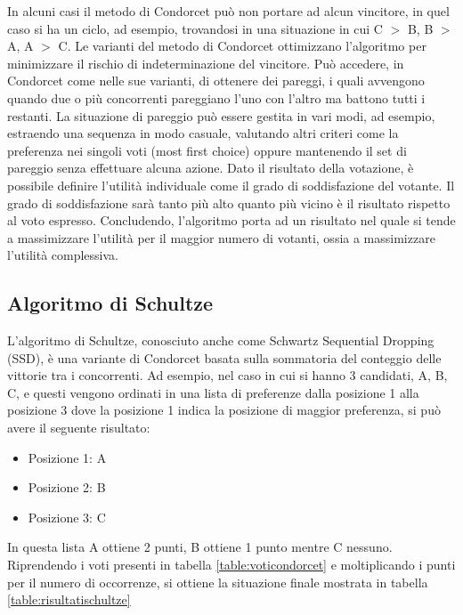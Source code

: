 \documentclass[12pt,a4paper,openright,twoside]{book}
\begin{document}
In alcuni casi il metodo di Condorcet può non portare ad alcun vincitore, in quel caso si
ha un ciclo, ad esempio, trovandosi in una situazione 
in cui C $>$ B, B $>$ A, A $>$ C.
Le varianti del metodo di Condorcet ottimizzano l'algoritmo per minimizzare il rischio
di indeterminazione del vincitore.
Può accedere, in Condorcet come nelle sue varianti, di ottenere dei pareggi,
i quali avvengono quando due o più concorrenti pareggiano l'uno con l'altro ma 
battono tutti i restanti. La situazione di pareggio può essere gestita in vari
modi, ad esempio, estraendo una sequenza in modo casuale, valutando altri criteri
come la preferenza nei singoli voti (most first choice) oppure mantenendo il set di pareggio
senza effettuare alcuna azione.
Dato il risultato della votazione, è possibile definire l'utilità individuale come il grado
di soddisfazione del votante. Il grado di soddisfazione sarà tanto più alto 
quanto più vicino è il risultato rispetto al voto espresso.
Concludendo, l'algoritmo porta ad un risultato nel quale si tende a massimizzare
l'utilità per il maggior numero di votanti, ossia a massimizzare l'utilità
complessiva. 

\subsection{Algoritmo di Schultze}
L'algoritmo di Schultze, conosciuto anche come Schwartz Sequential Dropping (SSD),
è una variante di Condorcet basata sulla sommatoria del conteggio delle vittorie tra i concorrenti.
Ad esempio, nel caso in cui si hanno 3 candidati, A, B, C,
e questi vengono ordinati in una lista di preferenze dalla posizione 1 alla posizione 3 dove la posizione 1 
indica la posizione di maggior preferenza, si può avere il seguente risultato:
\begin{itemize}
    \item{Posizione 1: A}
    \item{Posizione 2: B}
    \item{Posizione 3: C}
\end{itemize}    
In questa lista A ottiene 2 punti, B ottiene 1 punto mentre C nessuno.
Riprendendo i voti presenti in tabella \ref{table:voticondorcet} e moltiplicando
i punti per il numero di occorrenze, si ottiene la situazione finale mostrata in tabella \ref{table:risultatischultze}
\end{document}

